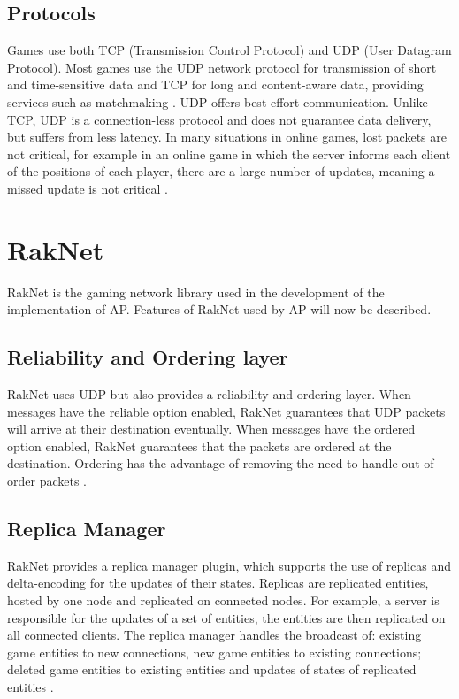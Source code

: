 \subsection{Protocols}
Games use both TCP (Transmission Control Protocol) and UDP (User Datagram Protocol). Most games use the UDP network protocol for transmission of short and time-sensitive data and TCP for long and content-aware data, providing services such as matchmaking \cite{2018NetworkTraffic, 2012PacketLevelTraffic}. UDP offers best effort communication. Unlike TCP, UDP is a connection-less protocol and does not guarantee data delivery, but suffers from less latency. In many situations in online games, lost packets are not critical, for example in an online game in which  the server informs each client of the positions of each player, there are a large number of updates, meaning a missed update is not critical \cite{pisan2004challenges}. 

\section{RakNet}
RakNet is the gaming network library used in the development of the implementation of AP. Features of RakNet used by AP will now be described.

\subsection{Reliability and Ordering layer}
RakNet uses UDP but also provides a reliability and ordering layer. When messages have the reliable option enabled, RakNet guarantees that UDP packets will arrive at their destination eventually. When messages have the ordered option enabled, RakNet guarantees that the packets are ordered at the destination. Ordering has the advantage of removing the need to handle out of order packets \cite{RakNetReliability}.

\subsection{Replica Manager}
RakNet provides a replica manager plugin, which supports the use of replicas and delta-encoding for the updates of their states. Replicas are replicated entities, hosted by one node and replicated on connected nodes. For example, a server is responsible for the updates of a set of entities, the entities are then replicated on all connected clients. The replica manager handles the broadcast of: existing game entities to new connections, new game entities to existing connections; deleted game entities to existing entities and updates of states of replicated entities \cite{RakNetReplica}.

